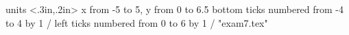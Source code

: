 
\beginpicture
  \setcoordinatesystem units <.3in,.2in>
  \setplotarea x from -5 to 5, y from 0 to 6.5
  \axis bottom %
    ticks numbered from -4 to 4 by 1 /
 \axis left ticks numbered from 0 to 6 by 1 /
 \setquadratic
 \plot  "exam7.tex"
\endpicture
